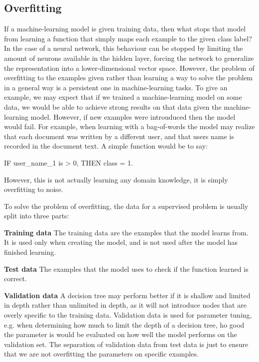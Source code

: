 \subsection{Overfitting}


If a machine-learning model is given training data, then what stops that model from learning a function that simply maps each example to the given class label? In the case of a neural network,  this behaviour can be stopped by limiting the amount of neurons available in the hidden layer, forcing the network to generalize the representation into a lower-dimensional vector space. However, the problem of overfitting to the examples given rather than learning a way to solve the problem in a general way is a persistent one in machine-learning tasks. To give an example, we may expect that if we trained a machine-learning model on some data, we would be able to achieve strong results on that data given the machine-learning model. However, if new examples were introuduced then the model would fail. For example, when learning with a bag-of-words the model may realize that each document was written by a different user, and that users name is recorded in the document text. A simple function would be to say:


IF user\_name\_1 is > 0, THEN class = 1.

However, this is not actually learning any domain knowledge, it is simply overfitting to noise.


To solve the problem of overfitting, the data for a supervised problem is usually split into three parts:

\textbf{Training data} The training data are the examples that the model learns from. It is used only when creating the model, and is not used after the model has finished learning.

\textbf{Test data} The examples that the model uses to check if the function learned is correct.

\textbf{Validation data} A decision tree may perform better if it is shallow and limited in depth rather than unlimited in depth, as it will not introduce nodes that are overly specific to the training data. Validation data is used for parameter tuning, e.g. when determining how much to limit the depth of a decision tree, ho good the parameter is would be evaluated on how well the model performs on the validation set. The separation of validation data from test data is just to ensure that we are not overfitting the parameters on specific examples.











